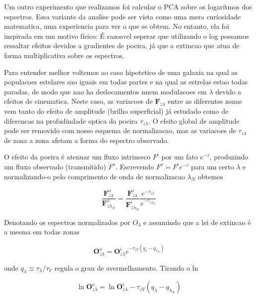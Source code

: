Um outro experimento que realizamos foi calcular o PCA sobre os logarítmos dos espectros.  Essa variante da analise pode ser vista como uma mera curiosidade matematica, uma experiencia para ver o que se obtem. No entanto, ela foi inspirada em um motivo físico: É razoavel esperar que utilizando o log possamos ressaltar efeitos devidos a gradientes de poeira, já que a extincao que atua de forma multiplicativa sobre os espectros.

Para entender melhor voltemos ao caso hipotetico de uma galaxia na qual as populacoes estelares sao iguais em todas partes e na qual as estrelas estao todas paradas, de modo que nao ha deslocamentos nnem modulacoes em $\lambda$ devido a efeitos de cinematica. Neste caso, as variacoes de $\textbf{F}{}_{z \lambda}$ entre as diferentes zonas vem tanto do efeito de amplitude (brilho superficial) já estudado como de diferencas na profudindade optica da poeira $\tau_{z \lambda}$. O efeito global de amplitude pode ser removido com nosso esquema de normalizacao, mas as variacoes de $\tau_{z \lambda}$ de zona a zona afetam a forma do espectro observado.

O efeito da poeira é atenuar um fluxo intrinseco $F^i$ por um fato $e^{-\tau}$, produzindo um fluxo observado (transmitido) $F^o$. Escrevendo $F^o = F^i e^{-\tau}$ para um certo $\lambda$ e normalizando-o pelo comprimento de onda de normalizacao $\lambda_N$ obtemos


\begin{equation}
\frac{\textbf{F}^o_{z \lambda} }{\textbf{F}^o_{z \lambda_N} } =
 \frac{\textbf{F}^i_{z \lambda}  }{\textbf{F}^i_{z \lambda_N} } 
 \frac{ e^{-\tau_{z \lambda}} }{ e^{-\tau_{z \lambda_N}}}
\end{equation}

Denotando os espectros normalizados por $O_\lambda$ e assumindo que a lei de extincao é a mesma em todas zonas

\begin{equation}
\textbf{O}^o_{z \lambda} = \textbf{O}^i_{z \lambda}
 e^{-\tau_{z V} (q_\lambda - q_{\lambda_N})}
\end{equation}

\noindent onde $q_\lambda \equiv \tau_\lambda / \tau_V$ regula o grau de avermelhamento. Tirando o ln

\begin{equation}
\ln \textbf{O}^o_{z \lambda} = \ln \textbf{O}^i_{z \lambda}
 -\tau_{z V} (q_\lambda - q_{\lambda_N})
\end{equation}


